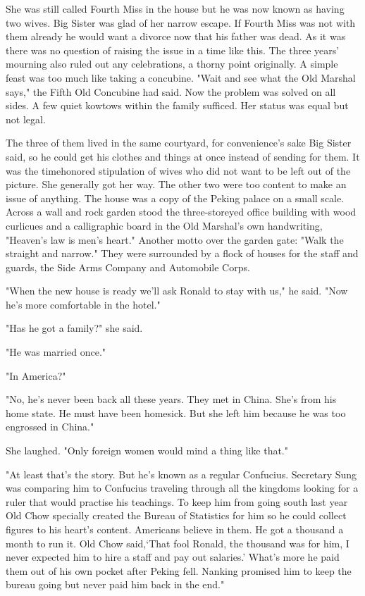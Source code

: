 \par She was still called Fourth Miss in the house but he was now known as having two wives. Big Sister was glad of her narrow escape. If Fourth Miss was not with them already he would want a divorce now that his father was dead. As it was there was no question of raising the issue in a time like this. The three years' mourning also ruled out any celebrations, a thorny point originally. A simple feast was too much like taking a concubine. "Wait and see what the Old Marshal says," the Fifth Old Concubine had said. Now the problem was solved on all sides. A few quiet kowtows within the family sufficed. Her status was equal but not legal.
\par The three of them lived in the same courtyard, for convenience's sake Big Sister said, so he could get his clothes and things at once instead of sending for them. It was the timehonored stipulation of wives who did not want to be left out of the picture. She generally got her way. The other two were too content to make an issue of anything. The house was a copy of the Peking palace on a small scale. Across a wall and rock garden stood the three-storeyed office building with wood curlicues and a calligraphic board in the Old Marshal's own handwriting, "Heaven's law is men's heart." Another motto over the garden gate: "Walk the straight and narrow." They were surrounded by a flock of houses for the staff and guards, the Side Arms Company and Automobile Corps.
\par "When the new house is ready we'll ask Ronald to stay with us," he said. "Now he's more comfortable in the hotel."
\par "Has he got a family?" she said.
\par "He was married once."
\par "In America?"
\par "No, he's never been back all these years. They met in China. She's from his home state. He must have been homesick. But she left him because he was too engrossed in China."
\par She laughed. "Only foreign women would mind a thing like that."
\par "At least that's the story. But he's known as a regular Confucius. Secretary Sung was comparing him to Confucius traveling through all the kingdoms looking for a ruler that would practise his teachings. To keep him from going south last year Old Chow specially created the Bureau of Statistics for him so he could collect figures to his heart's content. Americans believe in them. He got a thousand a month to run it. Old Chow said,‘That fool Ronald, the thousand was for him, I never expected him to hire a staff and pay out salaries.' What's more he paid them out of his own pocket after Peking fell. Nanking promised him to keep the bureau going but never paid him back in the end."
